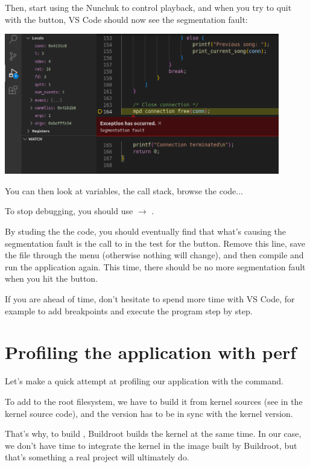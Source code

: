 Then, start using the Nunchuk to control playback, and when you try to
quit with the  button, VS Code should now see the segmentation
fault:

\includegraphics[width=12cm]{labs/sysdev-application-development-and-debugging/vscode-segmentation-fault.png}

You can then look at variables, the call stack, browse the code...

To stop debugging, you should use  $\rightarrow$ .

By studing the the code, you should eventually find that what's causing
the segmentation fault is the call to  in the test for the
 button. Remove this line, save the file through the 
menu (otherwise nothing will change), and then compile and run the
application again. This time, there should be no more segmentation fault
when you hit the  button.

If you are ahead of time, don't hesitate to spend more time with VS
Code, for example to add breakpoints and execute the program step by
step.

\section{Profiling the application with perf}

Let's make a quick attempt at profiling our application with the
 command.

To add  to the root filesystem, we have to build it from
kernel sources (see  in the kernel source code), and
the  version has to be in sync with the kernel version.

That's why, to build , Buildroot builds the kernel at the
same time. In our case, we don't have time to integrate the kernel in
the image built by Buildroot, but that's something a real project will
ultimately do.

